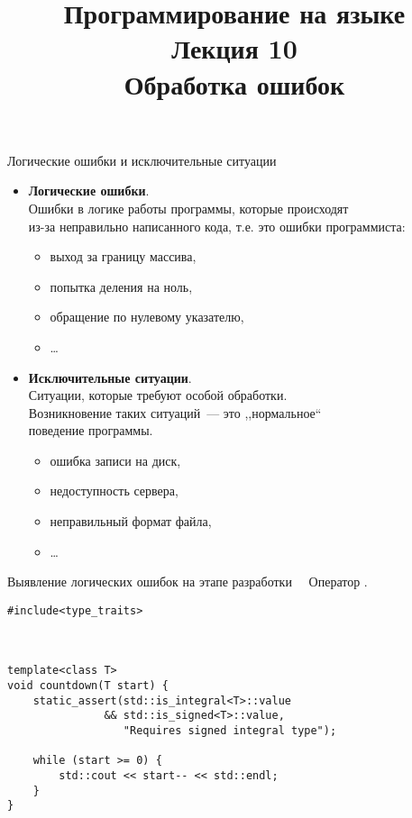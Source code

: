 \documentclass[aspectration=1610,t]{beamer}
\title{{\bf Программирование на языке \langcpp\protect\\Лекция
10\protect\vspace{1em}\\}Обработка ошибок}
\begin{document}
\begin{frame} 
  \titlepage
\end{frame}

\newcommand{\fakeitem}{{\color{MOOCBlue}\textbullet}\ \ }

\begin{frame}[fragile]{Логические ошибки и исключительные ситуации}
\begin{itemize}
\item \textbf{Логические ошибки}.\\
Ошибки в логике работы программы, которые происходят\\
из-за неправильно написанного кода, т.е. это ошибки программиста:
\begin{itemize} 
    \item выход за границу массива,
    \item попытка деления на ноль,
    \item обращение по нулевому указателю,
    \item \ldots
\end{itemize}
\pause
\item \textbf{Исключительные ситуации}.\\
Ситуации, которые требуют особой обработки.\\
Возникновение таких ситуаций~— это ,,нормальное``\\ поведение программы.
\begin{itemize} 
    \item ошибка записи на диск,
    \item недоступность сервера,
    \item неправильный формат файла,
    \item \ldots
\end{itemize}
\end{itemize}
\end{frame}

\begin{frame}[fragile]{Выявление логических ошибок на этапе разработки}
    \fakeitem Оператор .\\
    \mbox{}
    \begin{lstlisting}
#include<type_traits>



template<class T> 
void countdown(T start) {
    static_assert(std::is_integral<T>::value
               && std::is_signed<T>::value, 
                  "Requires signed integral type");
                  
    while (start >= 0) {
        std::cout << start-- << std::endl;
    }
}
    \end{lstlisting}
\end{frame}
\end{document}
